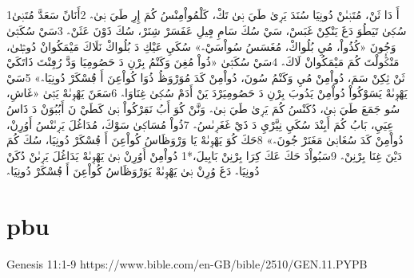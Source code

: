 \documentclass[12pt,fleqn,titlepage,twoside,a4paper]{book}
\begin{document}
\begin{arab}[utf]
\section*{}

1أَ دَا ثَنْ، مُتَنٜىٰنْ دُونِيَا سُنَدَ يَرٜىٰ طَيَ نٜىٰ تَكْ، كَلْمُواْمِنْسُ كُمَ إِرِ طَيَ نٜىٰ؞ 2أَنَانً سَعَدَّ مُتَنٜىٰ سُكٜىٰ تَيَطُوَ دَغَ يَنْكِنْ غَبَسْ، سَيْ سُكَ سَامِ ڢِيلِ عَڧَسَرْ شِنَرْ، سُكَ ذَوْنَ عَثَنْ؞ 3سَيْ سُكَثٜىٰ وَجُونَ ‏«‏كُذُواْ، مُيِ بُلُواكْ، مُغَسَسُ سُواْسَيْ؞»‏ سُكَيِ عَيْكِ دَ بُلُواكْ نَلَاكَ مَيْمَكُوانْ دُوڟٜىٰ، مَنْݣُولْتَ كُمَ مَيْمَكُوانْ لَاكَ؞ 4سَيْ سُكَثٜىٰ ‏«‏ذُواْ مُغِنَ وَكَنْمُ بِرْنِ دَ حَصُومِيَا وَدَّ رُڢِنْتَ ذَاتَكَيْ ثَنْ ثِكِنْ سَمَ، دُواْمِنْ مُيِ وَكَنْمُ سُونَ، دُواْمِنْ كَدَ مُوَرْوَڟُ ذُوَا كُواْعِنَ أَ ڢُسْكَرْ دُونِيَا؞»‏ 5سَيْ يَهْوٜىٰهْ يَسَوْكُواْ دُواْمِنْ يَدُوبَ بِرْنِ دَ حَصُومِيَرْدَ یَنْ أَدَمْ سُكٜىٰ غِنَاوَا؞ 6سَعَنً يَهْوٜىٰهْ يَثٜىٰ ‏«‏غَاشِ، سُو جَمَعَ طَيَ نٜىٰ، دُكَنْسُ كُمَ يَرٜىٰ طَيَ نٜىٰ؞ وَنَّنْ كُوَ أَبُ نَڢَرْكُواْ نٜىٰ كَطَيْ نَ أَبُبُوَنْ دَ ذَاسُ عِيَيِ، بَابُ كُمَ أَبِنْدَ سُكَيِ نِيَّرْيِ دَ ذَيْ غَغَرٜىٰسُ؞ 7ذُواْ مُسَاكٜىٰ سَوْكَ، مُدَاغُلَ يَرٜىٰنْسُ أَوُرِنْ، دُواْمِنْ كَدَ سُغَانٜىٰ مَغَنَرْ جُونَ؞»‏ 8حَكَ كُوَ يَهْوٜىٰهْ يَا وَرْوَڟَاسُ كُواْعِنَ أَ ڢُسْكَرْ دُونِيَا، سُكَ كُمَ دَيْنَ غِنَا بِرْنِنْ؞ 9سَبُواْدَ حَكَ عَكَ كِرَا بِرْنِنْ بَابِيلَ،*1 دُواْمِنْ أَوُرِنْ نٜىٰ يَهْوٜىٰهْ يَدَاغُلَ يَرٜىٰنْ دُكَنْ دُونِيَا؞ دَغَ وُرِنْ نٜىٰ يَهْوٜىٰهْ يَوَرْوَڟَاسُ كُواْعِنَ أَ ڢُسْكَرْ دُونِيَا؞ 

\end{arab}

\section{pbu}

Genesis 11:1-9 https://www.bible.com/en-GB/bible/2510/GEN.11.PYPB
\end{document}
